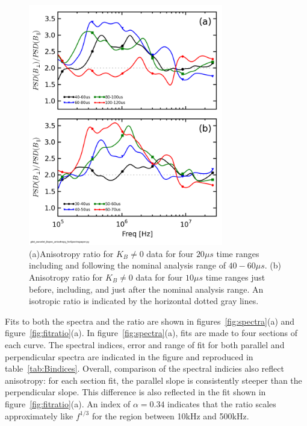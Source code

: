 \documentclass[aip,prl,amsmath,amssymb,reprint,superscriptaddress]{revtex4-1} %
\begin{document}
\begin{figure}[!htbp]
\centerline{
\includegraphics[width=8.5cm]{Bperppara_chan1t4_1mWbspectra_timescan}}
\caption{\label{fig:timeratio} (a)Anisotropy ratio for $K_{B}\neq 0$ data for four $20\mu s$ time ranges including and following the nominal analysis range of $40-60\mu s$. (b) Anisotropy ratio for $K_{B}\neq 0$ data for four $10\mu s$ time ranges just before, including, and just after the nominal analysis range. An isotropic ratio is indicated by the horizontal dotted gray lines.}
\end{figure}

Fits to both the spectra and the ratio are shown in figures~\ref{fig:spectra}(a) and figure~\ref{fig:fitratio}(a). In figure~\ref{fig:spectra}(a), fits are made to four sections of each curve. The spectral indices, error and range of fit for both parallel and perpendicular spectra are indicated in the figure and reproduced in table~\ref{tab:Bindices}. Overall, comparison of the spectral indicies also reflect anisotropy: for each section fit, the parallel slope is consistently steeper than the perpendicular slope. This difference is also reflected in the fit shown in figure~\ref{fig:fitratio}(a). An index of $\alpha = 0.34$ indicates that the ratio scales approximately like $f^{1/3}$ for the region between 10kHz and 500kHz.
\end{document}
